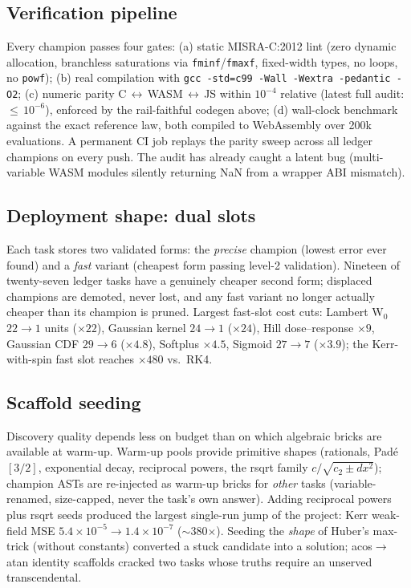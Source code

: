 \documentclass[11pt]{article}
\begin{document}
\subsection{Verification pipeline}
Every champion passes four gates: (a) static MISRA-C:2012 lint (zero dynamic allocation, branchless saturations via \texttt{fminf}/\texttt{fmaxf}, fixed-width types, no loops, no \texttt{powf}); (b) real compilation with \texttt{gcc -std=c99 -Wall -Wextra -pedantic -O2}; (c) numeric parity C\,$\leftrightarrow$\,WASM\,$\leftrightarrow$\,JS within $10^{-4}$ relative (latest full audit: ${\leq}\,10^{-6}$), enforced by the rail-faithful codegen above; (d) wall-clock benchmark against the exact reference law, both compiled to WebAssembly over 200k evaluations. A permanent CI job replays the parity sweep across all ledger champions on every push. The audit has already caught a latent bug (multi-variable WASM modules silently returning NaN from a wrapper ABI mismatch).

\subsection{Deployment shape: dual slots}
Each task stores two validated forms: the \emph{precise} champion (lowest error ever found) and a \emph{fast} variant (cheapest form passing level-2 validation). Nineteen of twenty-seven ledger tasks have a genuinely cheaper second form; displaced champions are demoted, never lost, and any fast variant no longer actually cheaper than its champion is pruned. Largest fast-slot cost cuts: Lambert W$_0$ $22{\to}1$ units ($\times22$), Gaussian kernel $24{\to}1$ ($\times24$), Hill dose--response $\times9$, Gaussian CDF $29{\to}6$ ($\times4.8$), Softplus $\times4.5$, Sigmoid $27{\to}7$ ($\times3.9$); the Kerr-with-spin fast slot reaches $\times480$ vs.\ RK4.

\subsection{Scaffold seeding}
Discovery quality depends less on budget than on which algebraic bricks are available at warm-up. Warm-up pools provide primitive shapes (rationals, Pad\'e $[3/2]$, exponential decay, reciprocal powers, the rsqrt family $c/\sqrt{c_2 \pm d x^2}$); champion ASTs are re-injected as warm-up bricks for \emph{other} tasks (variable-renamed, size-capped, never the task's own answer). Adding reciprocal powers plus rsqrt seeds produced the largest single-run jump of the project: Kerr weak-field MSE $5.4\times10^{-5} \to 1.4\times10^{-7}$ ($\sim$380$\times$). Seeding the \emph{shape} of Huber's max-trick (without constants) converted a stuck candidate into a solution; acos$\to$atan identity scaffolds cracked two tasks whose truths require an unserved transcendental.
\end{document}
